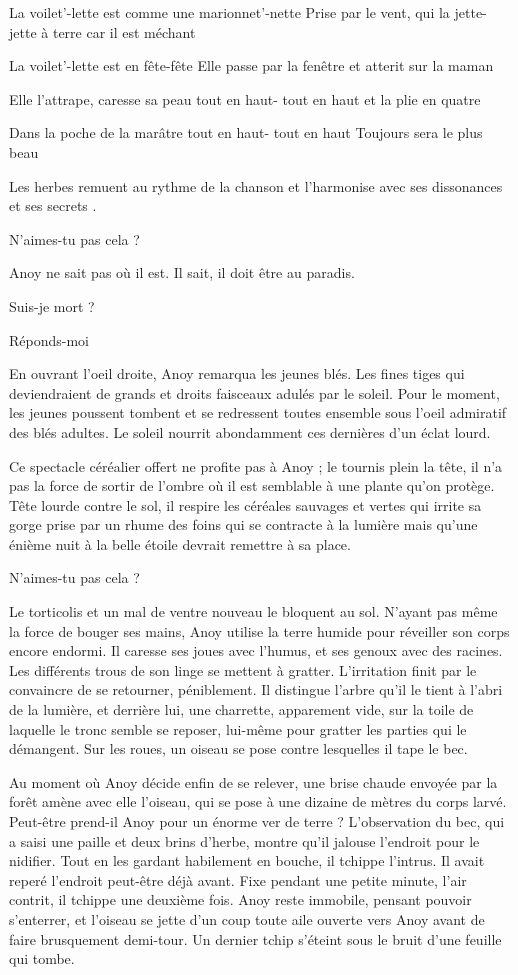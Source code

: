 La voilet'-lette est comme une marionnet'-nette
Prise par le vent, qui la jette-jette
à terre car il est méchant

La voilet'-lette est en fête-fête
Elle passe par la fenêtre
et atterit sur la maman

Elle l'attrape, caresse sa peau
tout en haut- tout en haut
et la plie en quatre

Dans la poche de la marâtre
tout en haut- tout en haut
Toujours sera le plus beau

Les herbes remuent au rythme de la chanson et l'harmonise avec ses
dissonances et ses secrets .

N'aimes-tu pas cela ?

Anoy ne sait pas où il est. Il sait, il doit être au paradis.

Suis-je mort ?

Réponds-moi

En ouvrant l'oeil droite, Anoy remarqua les jeunes blés. Les fines
tiges qui deviendraient de grands et droits faisceaux adulés par le
soleil. Pour le moment, les jeunes poussent tombent et se redressent
toutes ensemble sous l'oeil admiratif des blés adultes. Le soleil
nourrit abondamment ces dernières d'un éclat lourd.

Ce spectacle céréalier offert ne profite pas à Anoy ; le tournis plein
la tête, il n'a pas la force de sortir de l'ombre où il est semblable
à une plante qu'on protège. Tête lourde contre le sol, il respire les
céréales sauvages et vertes qui irrite sa gorge prise par un rhume des
foins qui se contracte à la lumière mais qu'une énième nuit à la
belle étoile devrait remettre à sa place.

N'aimes-tu pas cela ?

Le torticolis et un mal de ventre nouveau le bloquent au sol. N'ayant
pas même la force de bouger ses mains, Anoy utilise la terre humide
pour réveiller son corps encore endormi. Il caresse ses joues avec
l'humus, et ses genoux avec des racines. Les différents trous de son
linge se mettent à gratter. L'irritation finit par le convaincre de se
retourner, péniblement. Il distingue l'arbre qu'il le tient à l'abri
de la lumière, et derrière lui, une charrette, apparement vide, sur la
toile de laquelle le tronc semble se reposer, lui-même pour gratter les
parties qui le démangent. Sur les roues, un oiseau se pose contre
lesquelles il tape le bec.

Au moment où Anoy décide enfin de se relever, une brise chaude envoyée
par la forêt amène avec elle l'oiseau, qui se pose à une dizaine de
mètres du corps larvé. Peut-être prend-il Anoy pour un énorme ver de
terre ?  L'observation du bec, qui a saisi une paille et deux brins
d'herbe, montre qu'il jalouse l'endroit pour le nidifier. Tout en les
gardant habilement en bouche, il tchippe l'intrus. Il avait reperé
l'endroit peut-être déjà avant. Fixe pendant une petite minute, l'air
contrit, il tchippe une deuxième fois. Anoy reste immobile, pensant
pouvoir s'enterrer, et l'oiseau se jette d'un coup toute aile ouverte
vers Anoy avant de faire brusquement demi-tour. Un dernier tchip
s'éteint sous le bruit d'une feuille qui tombe.

